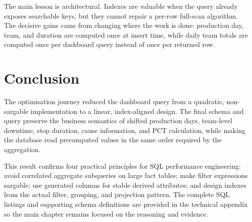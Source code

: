 The main lesson is architectural. Indexes are valuable when the query already exposes searchable keys, but they cannot repair a per-row full-scan algorithm. The decisive gains came from changing where the work is done: production day, team, and duration are computed once at insert time, while daily team totals are computed once per dashboard query instead of once per returned row.

\section{Conclusion}

The optimisation journey reduced the dashboard query from a quadratic, non-sargable implementation to a linear, index-aligned design. The final schema and query preserve the business semantics of shifted production days, team-level downtime, stop duration, cause information, and PCT calculation, while making the database read precomputed values in the same order required by the aggregation.

This result confirms four practical principles for SQL performance engineering: avoid correlated aggregate subqueries on large fact tables; make filter expressions sargable; use generated columns for stable derived attributes; and design indexes from the actual filter, grouping, and projection pattern. The complete SQL listings and supporting schema definitions are provided in the technical appendix so the main chapter remains focused on the reasoning and evidence.
